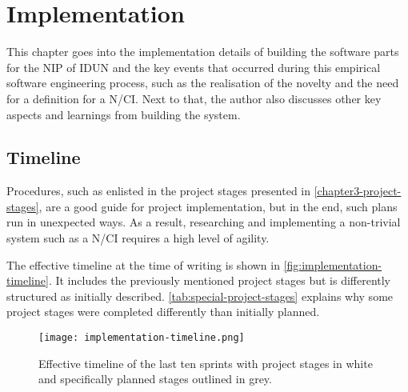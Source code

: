 \chapter{Implementation}
\graphicspath{{Chapter4/Figs/}{Chapter4/Figs/}}

This chapter goes into the implementation details of building the software parts for the NIP of IDUN and the key events that occurred during this empirical software engineering process, such as the realisation of the novelty and the need for a definition for a N/CI. Next to that, the author also discusses other key aspects and learnings from building the system.

\section{Timeline}
\label{chapter4-timeline}

Procedures, such as enlisted in the project stages presented in \autoref{chapter3-project-stages}, are a good guide for project implementation, but in the end, such plans run in unexpected ways. As a result, researching and implementing a non-trivial system such as a N/CI requires a high level of agility.

The effective timeline at the time of writing is shown in \autoref{fig:implementation-timeline}. It includes the previously mentioned project stages but is differently structured as initially described. \autoref{tab:special-project-stages} explains why some project stages were completed differently than initially planned.

\begin{figure}[!ht]
  \centering
  \texttt{[image: implementation-timeline.png]}
  \caption{Effective timeline of the last ten sprints with project stages in white and specifically planned stages outlined in grey.}
  \label{fig:implementation-timeline}
\end{figure}


